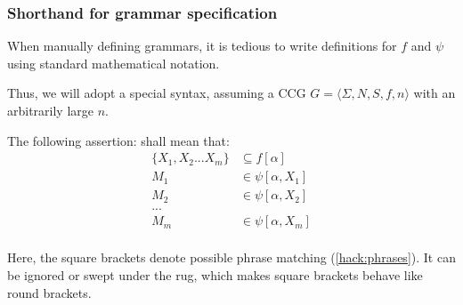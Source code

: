 \documentclass[main.tex]{subfiles}
\begin{document}
\subsubsection{Shorthand for grammar specification}
\label{shorthand}
When manually defining grammars, it is tedious to write definitions
for $f$ and $\psi$ using standard mathematical notation.

Thus, we will adopt a special syntax, assuming a CCG
$G = \langle \Sigma, N, S, f, n \rangle$ with an arbitrarily large $n$.

The following assertion:
shall mean that:
\begin{align*}
    \{ X_1, X_2 ... X_m \} & \subseteq f[\alpha] \\
    M_1 & \in \psi[\alpha, X_1] \\
    M_2 & \in \psi[\alpha, X_2] \\
    ... & \\
    M_m & \in \psi[\alpha, X_m] \\
\end{align*}

Here, the square brackets denote possible phrase matching (\cref{hack:phrases}). It can
be ignored or swept under the rug, which makes square brackets behave like
round brackets.
\end{document}
